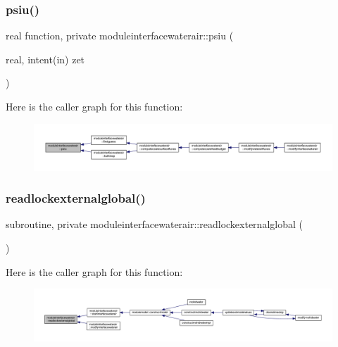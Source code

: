 \subsubsection{\texorpdfstring{psiu()}{psiu()}}
{\footnotesize\ttfamily real function, private moduleinterfacewaterair\+::psiu (\begin{DoxyParamCaption}\item[{real, intent(in)}]{zet }\end{DoxyParamCaption})\hspace{0.3cm}{\ttfamily [private]}}

Here is the caller graph for this function\+:\nopagebreak
\begin{figure}[H]
\begin{center}
\leavevmode
\includegraphics[width=350pt]{namespacemoduleinterfacewaterair_af976a3b281048d4f32222b16621b556a_icgraph}
\end{center}
\end{figure}
\mbox{\label{namespacemoduleinterfacewaterair_a859b7054113f5f1ab347adbd693c2e16}} 
\subsubsection{\texorpdfstring{readlockexternalglobal()}{readlockexternalglobal()}}
{\footnotesize\ttfamily subroutine, private moduleinterfacewaterair\+::readlockexternalglobal (\begin{DoxyParamCaption}{ }\end{DoxyParamCaption})\hspace{0.3cm}{\ttfamily [private]}}

Here is the caller graph for this function\+:\nopagebreak
\begin{figure}[H]
\begin{center}
\leavevmode
\includegraphics[width=350pt]{namespacemoduleinterfacewaterair_a859b7054113f5f1ab347adbd693c2e16_icgraph}
\end{center}
\end{figure}
\mbox{\label{namespacemoduleinterfacewaterair_a78276c71fe608663c6c964c59c8c7626}} 
